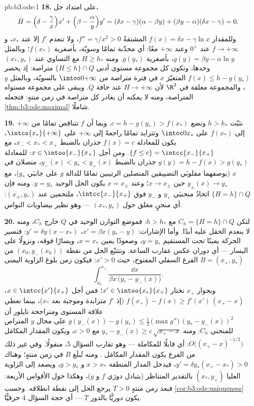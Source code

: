 \begin{solution}{pb:b3:ode:1}
\textbf{18.} على امتداد حل،
\[
\dot H = \Bigl(\delta - \frac\gamma x\Bigr)x' +
\Bigl(\beta - \frac\alpha y\Bigr)y'
= (\delta x - \gamma)(\alpha - \beta y) +
(\beta y - \alpha)(\delta x - \gamma) = 0 .
\]
وللمقدار $f(x) = \delta x - \gamma\ln x$ المشتقةُ $f'' = \gamma/x^2 > 0$، ولا تنعدم $f'$ إلا عند
$x_*$، و $f \to +\infty$ عند $0^+$ وعند $+\infty$ معًا: أي
محدّبة تمامًا وسويّة، بأصغرية $f(x_*)$؛ وبالمثل $g(y) = \beta y - \alpha\ln y$،
بأصغرية $g(y_*)$. ومنه $H \geq h_*$ مع التساوي عند $(x_*,
y_*)$
وحدها، وتكون كل مجموعة مستوى أدنى $\{H \leq h\}\cap Q$ متراصة: إذ يحصر
$f(x) \leq h - g(y_*)$ المتغيّرَ $x$ في فترة متراصة من $\intoo0{+\infty}$ بالسويّة،
وبالمثل $y$، والمجموعة مغلقة في $\R^2$ لأن $H \to +\infty$ عند
حافة $Q$. ويبقى  على مجموعة مستواه المتراصة، ومنه
لا يمكنه أن يغادر كل متراصة في زمن منتهٍ: فتجعله \cref{thm:b3:ode:maximal}
شاملًا.

\textbf{19.} نثبّت $h > h_*$ ونضع $c = h - g(y_*) >
f(x_*)$. وبما أن $f$ تتناقص
تمامًا من $+\infty$ إلى $f(x_*)$ على $\intoc0{x_*}$ وتتزايد
تمامًا راجعةً إلى $+\infty$ على $\intco{x_*}{+\infty}$، يكون للمعادلة
$f(x) = c$ جذران بالضبط $x_- < x_* < x_+$، مع $\{f \leq c\} =
\intcc{x_-}{x_+}$. ومن أجل $x \in \intoo{x_-}{x_+}$:
للمعادلة $g(y) = h -
f(x) > g(y_*)$ جذران بالضبط $y_-(x) < y_* <
y_+(x)$، متصلان في $x$ (بوصفهما
مقلوبَي التضييقين المتصلين الرتيبين تمامًا للدالة $g$ على جانبَي
$y_*$)، مع $y_\pm(x) \to y_*$ حين $x \to x_\pm$؛ وعند $x =
x_\pm$ يكون الحل
الوحيد $y = y_*$. ومنه فإن $\{H = h\}\cap
Q$ اتحادُ منحنيَي $y_+$
و $y_-$ فوق $\intcc{x_-}{x_+}$، ملتحمين عند $(x_\pm, y_*)$: أي منحنٍ مغلق
حول $(x_*, y_*)$ --- وهو نظير بيضاويات النواس.

\textbf{20.} لتكن $C_h = \{H = h\}\cap Q$ مع $h > h_*$: فموضع التوازن الوحيد في
$Q$ خارج $C_h$، ومنه لا ينعدم الحقل عليه أبدًا. وأما الإشارات:
$x' = \beta x(y_* - y)$، $y' =
\delta y(x - x_*)$: فتسير الحركة يمينًا تحت المستقيم $y
= y_*$،
وصعودًا يمين $x = x_*$، ويسارًا فوقه، ونزولًا على اليسار --- أي
دوران عكس عقارب الساعة. ونتتبّع الحل من نقطة $(x_0, y_-(x_0))$ من الفرع
السفلي المفتوح، حيث $x' > 0$: فيكون زمن بلوغ الزاوية اليمنى
$B = (x_+, y_*)$
\[
\int_{x_0}^{x_+}\frac{\dd x}{\beta x\,\bigl(y_* -
y_-(x)\bigr)} .
\]
وبجوار $x_+$ نختار $x' \in \intoo{x_*}{x_+}$؛ فمن أجل $x \in
\intcc{x'}{x_+}$، $f(x_+) - f(x) \geq f'(x')\,(x_+ - x)$ (إذ $f'$
متزايدة وموجبة بعد $x_*$)، بينما تعطي علاقة المستوى ومتراجحة
تايلور أن $g(y_-(x)) -
g(y_*) \leq \frac12\,\bigl(\max g''\bigr)\,(y_* -
y_-(x))^2$ على مجال $y$ المتراص للمنحني $C_h$: ومنه
$y_* -
y_-(x) \geq c\,\sqrt{x_+ - x}$ مع $c > 0$، ويكون المقدار المكامَل $O\bigl((x_+ - x)^{-1/2}\bigr)$: أي قابلًا
للمكاملة --- وهو تقارب السؤال 5، منقولًا. وفي غير ذلك من الفرع
يكون المقدار المكامَل . ومنه تُبلَغ $B$ في زمن منتهٍ؛
وهناك $y' = \delta y_*(x_+ - x_*) > 0$، فيدخل المدار المنطقة $x > x_*$ و $y > y_*$،
ويصعد إلى الزاوية العليا $(x_*, y_+)$ بالتقدير المتناظر
(بتبادل دورَي $f$ و $g$)، وهكذا حول الأقواس الأربعة: فبعد زمن
منتهٍ $T > 0$ يرجع الحل إلى نقطة انطلاقه. وحسب \cref{cor:b3:ode:uniqueness}
يكون دوريًّا بالدور $T$ --- أي حجة السؤال 4 حرفيًّا.


\end{solution}
